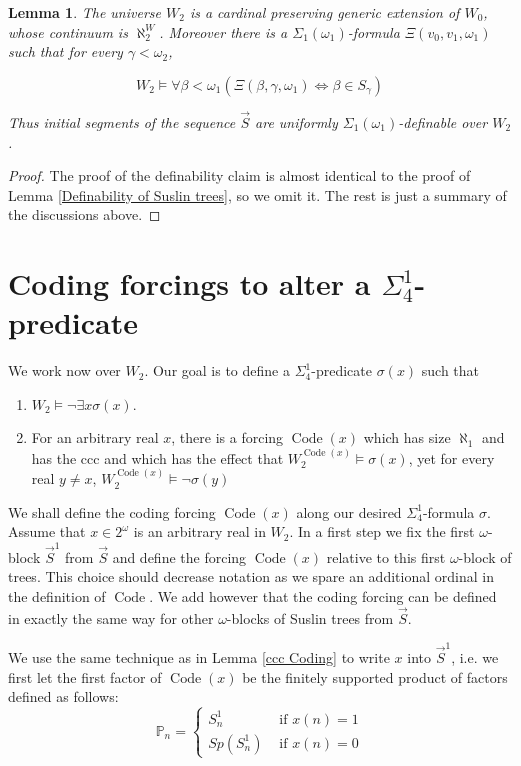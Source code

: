 \documentclass[a4paper,11pt]{article}
\newtheorem{lemma}[theorem]{Lemma}
\newcommand{\forceP}{\mathbb{P}}
\begin{document}
\begin{lemma}\label{definabilityofvecT}
The universe $W_2$ is a cardinal preserving generic extension of $W_0$, whose continuum is $\aleph_2^W$. Moreover
there is a $\Sigma_1(\omega_1)$-formula $\Xi(v_0,v_1,\omega_1)$ {such that for every} $\gamma < \omega_2$,

\[ W_2 \models \forall \beta < \omega_1 (\Xi (\beta, \gamma,\omega_1) \Leftrightarrow \beta \in S_{\gamma}) \]
 
Thus initial segments  of the sequence $\vec{S} $ are uniformly  $\Sigma_1(\omega_1)$-definable over $W_2$.
\end{lemma}
\begin{proof}
The proof of the definability claim is almost identical to the proof of Lemma \ref{Definability of Suslin trees}, so we omit it. The rest is just a summary of the discussions above.
\end{proof}




\section{Coding forcings to alter a $\Sigma^1_4$-predicate}
We work now over $W_2$. Our goal is to define a $\Sigma^1_4$-predicate $\sigma(x)$ such that
\begin{enumerate}
\item $W_2 \models \lnot \exists x \sigma (x)$.
\item For an arbitrary real $x$, there is a forcing $\operatorname{Code} (x)$ which has size $\aleph_1$ and has the ccc and which has the effect that $W_2^{\operatorname{Code} (x)} \models \sigma (x)$, yet for every real $y \ne x$, 
$W_2^{\operatorname{Code} (x)} \models \lnot \sigma (y)$
\end{enumerate}

We shall define the coding forcing $\operatorname{Code} (x)$ along our desired $\Sigma^1_4$-formula $\sigma$. Assume that $x \in 2^{\omega}$ is an arbitrary real in $W_2$. 
In a first step we fix the first $\omega$-block $\vec{S}^1$ from $\vec{S}$ and define the forcing $\operatorname{Code} (x)$ relative to this first $\omega$-block of trees. This choice should decrease notation as we spare an additional ordinal in the definition of $\operatorname{Code}$. We add however that the coding forcing can be defined in exactly the same way for other $\omega$-blocks of Suslin trees from $\vec{S}.$ 

We use the same technique as in Lemma \ref{ccc Coding} to write $x$ into $\vec{S}^1$, i.e. we first let the first factor of $\operatorname{Code}(x)$ be the finitely supported product of factors defined as follows:
\begin{equation*}
\forceP_{n } = \begin{cases}
S^1_{n}  & \text{ if } x(n)=1 \\ Sp(S^1_{n}) & \text{ if } x(n)=0
\end{cases}
\end{equation*}
\end{document}
